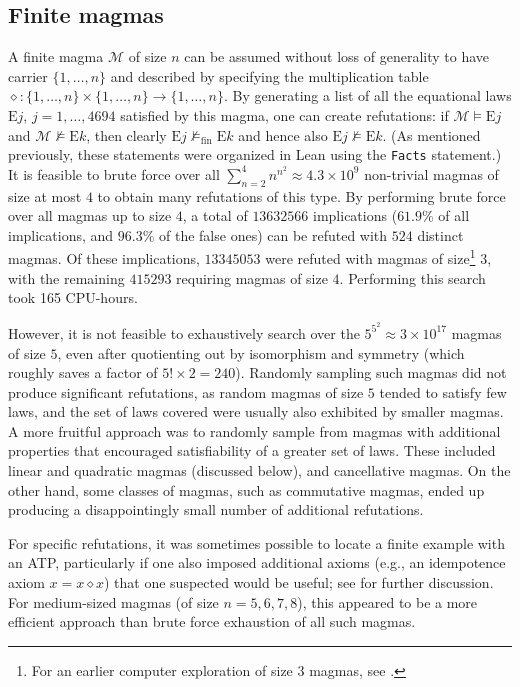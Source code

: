 \documentclass[12pt]{amsart}
\theoremstyle{definition}
\newcommand{\op}{\diamond}
\newcommand{\nmodels}{\not\models}
\newcommand{\nmodelsfin}{\nmodels_{\mathrm{fin}}}
\newcommand{\Magma}{{\mathcal{M}}}
\newcommand{\Eq}[1]{\mathrm{E}#1}
\begin{document}
\subsection{Finite magmas}\label{finite-sec}

A finite magma $\Magma$ of size $n$ can be assumed without loss of generality to have carrier $\{1,\dots,n\}$ and described by specifying the multiplication table $\op \colon \{1,\dots,n\} \times \{1,\dots,n\} \to \{1,\dots,n\}$.  By generating a list of all the equational laws $\Eq{j}$, $j=1,\dots,4694$ satisfied by this magma, one can create refutations: if $\Magma \models \Eq{j}$ and $\Magma \not \models \Eq{k}$, then clearly $\Eq{j} \nmodelsfin \Eq{k}$ and hence also $\Eq{j} \nmodels \Eq{k}$.  (As mentioned previously, these statements were organized in Lean using the \texttt{Facts} statement.) It is feasible to brute force over all $\sum_{n=2}^4 n^{n^2} \approx 4.3 \times 10^9$ non-trivial magmas of size at most $4$ to obtain many refutations of this type.
By performing brute force over all magmas up to size $4$, a total of $\num{13632566}$ implications ($61.9\%$ of all implications, and $96.3\%$ of the false ones) can be refuted with $524$ distinct magmas. Of these implications, $\num{13345053}$ were refuted with magmas of size\footnote{For an earlier computer exploration of size $3$ magmas, see \cite{berman-burris}.} $3$, with the remaining $\num{415293}$ requiring magmas of size $4$. Performing this search took 165 CPU-hours.

However, it is not feasible to exhaustively search over the $5^{5^2} \approx 3 \times 10^{17}$ magmas of size $5$, even after quotienting out by isomorphism and symmetry (which roughly saves a factor of $5! \times 2 = 240$).  Randomly sampling such magmas did not produce significant refutations, as random magmas of size $5$ tended to satisfy few laws, and the set of laws covered were usually also exhibited by smaller magmas.  A more fruitful approach was to randomly sample from magmas with additional properties that encouraged satisfiability of a greater set of laws.  These included linear and quadratic magmas (discussed below), and cancellative magmas.  On the other hand, some classes of magmas, such as commutative magmas, ended up producing a disappointingly small number of additional refutations.

For specific refutations, it was sometimes possible to locate a finite example with an ATP, particularly if one also imposed additional axioms (e.g., an idempotence axiom $x = x \op x$) that one suspected would be useful; see  for further discussion.  For medium-sized magmas (of size $n=5,6,7,8$), this appeared to be a more efficient approach than brute force exhaustion of all such magmas.
\end{document}
